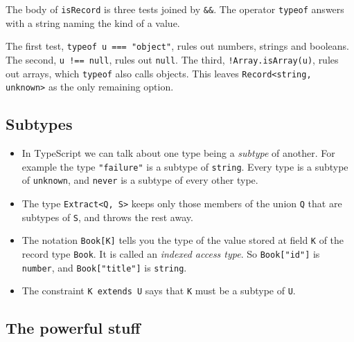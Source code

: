 \documentclass[11pt,a4paper]{article}
\begin{document}
The body of \texttt{isRecord} is three tests joined by \texttt{\&\&}. The operator \texttt{typeof}
answers with a string naming the kind of a value.

The first test, \texttt{typeof u === "object"}, rules out numbers, strings and booleans. The
second, \texttt{u !== null}, rules out \texttt{null}. The third, \texttt{!Array.isArray(u)}, rules
out arrays, which \texttt{typeof} also calls objects. This leaves
\texttt{Record<string, unknown>} as the only remaining option.

\newpage

\subsection{Subtypes}

\begin{listbox}
\begin{itemize}\setlength{\itemsep}{2pt}

\item In TypeScript we can talk about one type being a \emph{subtype} of another. For example
      the type \texttt{"failure"} is a subtype of \texttt{string}. Every type is a subtype of
      \texttt{unknown}, and \texttt{never} is a subtype of every other type.

\item The type \texttt{Extract<Q, S>} keeps only those members of the union \texttt{Q} that are
      subtypes of \texttt{S}, and throws the rest away.

\item The notation \texttt{Book[K]} tells you the type of the value stored at field \texttt{K}
      of the record type \texttt{Book}. It is called an \emph{indexed access type}. So
      \texttt{Book["id"]} is \texttt{number}, and \texttt{Book["title"]} is \texttt{string}.

\item The constraint \texttt{K extends U} says that \texttt{K} must be a subtype of \texttt{U}.

\end{itemize}
\end{listbox}

\subsection{The powerful stuff}
\end{document}
